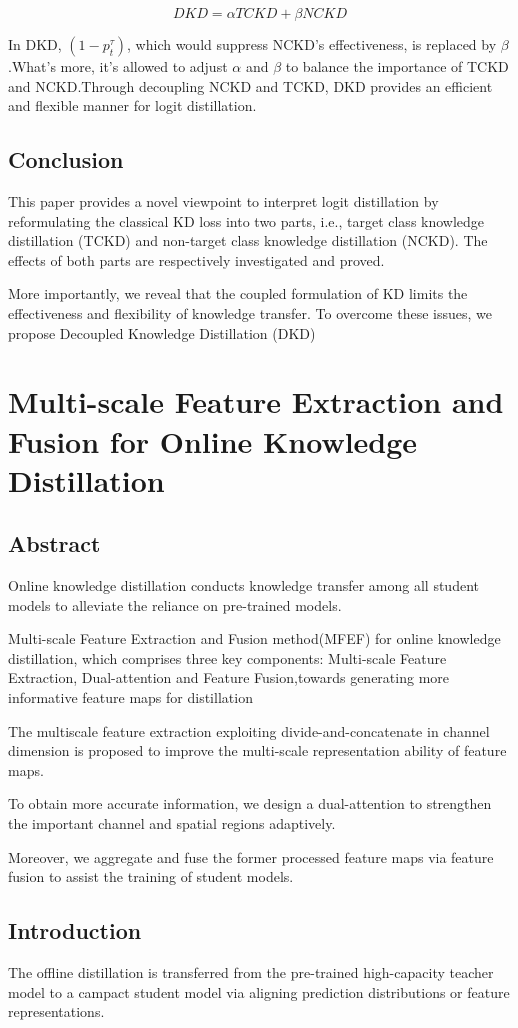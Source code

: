 \documentclass[11pt]{article}
\begin{document}
$$DKD = \alpha TCKD + \beta NCKD$$

In DKD, $(1-p_t^\tau)$, which would suppress NCKD's effectiveness, is replaced by $\beta$.What’s more, it’s allowed to adjust $\alpha$ and $\beta$ to balance the importance of TCKD and NCKD.Through decoupling NCKD and TCKD, DKD provides an efficient and flexible manner for logit distillation. 
\subsection{Conclusion}
This paper provides a novel viewpoint to interpret logit distillation by reformulating the classical KD loss into two parts, i.e., target class knowledge distillation (TCKD) and non-target class knowledge distillation (NCKD). The effects of both parts are respectively investigated and proved.

More importantly, we reveal that the coupled formulation of KD limits the effectiveness and flexibility of knowledge transfer. To overcome these issues, we propose Decoupled Knowledge Distillation (DKD)
\section{Multi-scale Feature Extraction and Fusion for Online Knowledge Distillation}
\subsection{Abstract}
Online knowledge distillation conducts knowledge transfer among all student models to alleviate the reliance on pre-trained models.

Multi-scale Feature Extraction and Fusion method(MFEF) for online knowledge distillation, which comprises three key components: Multi-scale Feature Extraction, Dual-attention and Feature Fusion,towards generating more informative feature maps for distillation

The multiscale feature extraction exploiting divide-and-concatenate in channel dimension is proposed to improve the multi-scale representation ability of feature
maps.

To obtain more accurate information, we design a dual-attention to strengthen the important channel and spatial regions adaptively.

Moreover, we aggregate and fuse the former processed feature maps via feature fusion
to assist the training of student models.
\subsection{Introduction}
The offline distillation is transferred from the pre-trained high-capacity teacher model to a campact student model via aligning prediction distributions or feature representations.
\end{document}
